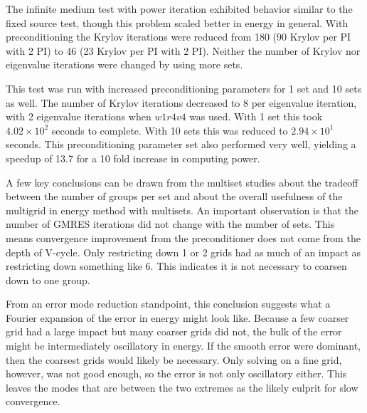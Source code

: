 The infinite medium test with power iteration exhibited behavior similar to the fixed source test, though this problem scaled better in energy in general. With preconditioning the Krylov iterations were reduced from 180 (90 Krylov per PI with 2 PI) to 46 (23 Krylov per PI with 2 PI). Neither the number of Krylov nor eigenvalue iterations were changed by using more sets.  

This test was run with increased preconditioning parameters for 1 set and 10 sets as well. The number of Krylov iterations decreased to 8 per eigenvalue iteration, with 2 eigenvalue iterations when $w1r4v4$ was used. With 1 set this took $4.02 \times 10^{2}$ seconds to complete. With 10 sets this was reduced to $2.94 \times 10^{1}$ seconds. This preconditioning parameter set also performed very well, yielding a speedup of 13.7 for a 10 fold increase in computing power.  
 
A few key conclusions can be drawn from the multiset studies about the tradeoff between the number of groups per set and about the overall usefulness of the multigrid in energy method with multisets. An important observation is that the number of GMRES iterations did not change with the number of sets. This means convergence improvement from the preconditioner does not come from the depth of V-cycle. Only restricting down 1 or 2 grids had as much of an impact as restricting down something like 6. This indicates it is not necessary to coarsen down to one group. 

From an error mode reduction standpoint, this conclusion suggests what a Fourier expansion of the error in energy might look like. Because a few coarser grid had a large impact but many coarser grids did not, the bulk of the error might be intermediately oscillatory in energy. If the smooth error were dominant, then the coarsest grids would likely be necessary. Only solving on a fine grid, however, was not good enough, so the error is not only oscillatory either. This leaves the modes that are between the two extremes as the likely culprit for slow convergence. 


